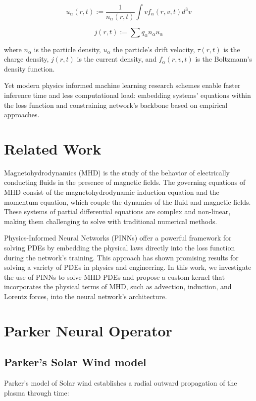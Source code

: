 \documentclass[12pt]{article}
\begin{document}
\begin{equation}
    u_{\alpha} (r, t) := \frac{1}{n_{\alpha}(r, t)} \int v f_{\alpha}(r, v, t) d^3v
\end{equation}

\begin{equation}
    j(r, t) := \sum q_{\alpha} n_{\alpha} u_{\alpha}
\end{equation}

where $n_{\alpha}$ is the particle density, $u_{\alpha}$ the particle's drift velocity, $\tau(r, t)$ is the charge density, $j(r, t)$ is the current density, and $f_{\alpha}(r, v, t)$ is the Boltzmann's density function.

Yet modern physics informed machine learning research schemes enable faster inference time and less computational load: embedding systems' equations within the loss function and constraining network's backbone based on empirical approaches.

\section{Related Work}
Magnetohydrodynamics (MHD) is the study of the behavior of electrically conducting fluids in the presence of magnetic fields. The governing equations of MHD consist of the magnetohydrodynamic induction equation and the momentum equation, which couple the dynamics of the fluid and magnetic fields. These systems of partial differential equations are complex and non-linear, making them challenging to solve with traditional numerical methods.

Physics-Informed Neural Networks (PINNs) offer a powerful framework for solving PDEs by embedding the physical laws directly into the loss function during the network's training. This approach has shown promising results for solving a variety of PDEs in physics and engineering. In this work, we investigate the use of PINNs to solve MHD PDEs and propose a custom kernel that incorporates the physical terms of MHD, such as advection, induction, and Lorentz forces, into the neural network's architecture.


\section{Parker Neural Operator}

\subsection{Parker's Solar Wind model}
Parker's model of Solar wind establishes a radial outward propagation of the plasma through time:
\end{document}

